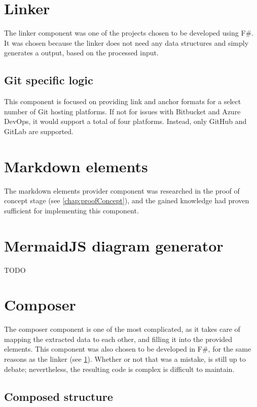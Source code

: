\section{Linker} \label{sec:linker}

The linker component was one of the projects chosen to be developed using F\#. It was chosen because the linker does not need any data structures and simply generates a output, based on the processed input.

\subsection{Git specific logic}

This component is focused on providing link and anchor formats for a select number of Git hosting platforms. If not for issues with Bitbucket and Azure DevOps, it would support a total of four platforms. Instead, only GitHub and GitLab are supported.

\section{Markdown elements}

The markdown elements provider component was researched in the proof of concept stage (see \ref{chap:proofConcept}), and the gained knowledge had proven sufficient for implementing this component.

\section{MermaidJS diagram generator}

TODO

\section{Composer}

The composer component is one of the most complicated, as it takes care of mapping the extracted data to each other, and filling it into the provided elements. This component was also chosen to be developed in F\#, for the same reasons as the linker (see \ref{sec:linker}). Whether or not that was a mistake, is still up to debate; nevertheless, the resulting code is complex is difficult to maintain.

\subsection{Composed structure}

